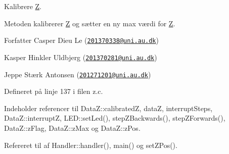 Kalibrere \hyperlink{class_z}{Z}. 

Metoden kalibrerer \hyperlink{class_z}{Z} og sætter en ny max værdi for \hyperlink{class_z}{Z}.

\begin{DoxyAuthor}{Forfatter}
Casper Dieu Le (\href{mailto:201370338@uni.au.dk}{\tt 201370338@uni.\+au.\+dk}) 

Kasper Hinkler Uldbjerg (\href{mailto:201370281@uni.au.dk}{\tt 201370281@uni.\+au.\+dk}) 

Jeppe Stærk Antonsen (\href{mailto:201271201@uni.au.dk}{\tt 201271201@uni.\+au.\+dk}) 
\end{DoxyAuthor}


Defineret på linje 137 i filen z.\+c.



Indeholder referencer til Data\+Z\+::calibratedZ, dataZ, interrupt\+Steps, Data\+Z\+::interruptZ, L\+E\+D\+::set\+Led(), step\+Z\+Backwards(), step\+Z\+Forwards(), Data\+Z\+::z\+Flag, Data\+Z\+::z\+Max og Data\+Z\+::z\+Pos.



Refereret til af Handler\+::handler(), main() og set\+Z\+Pos().


